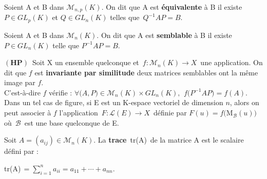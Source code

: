 \vspace{1.3cm}

Soient A et B dans \(\mathcal{M}_{n,p}(K)\). On dit que A est \textbf{équivalente} à B \ssi il existe \(P\in GL_p(K)\) et \(Q\in GL_n(K)\) telles que \(\,Q^{-1}AP=B\).

\vspace{1cm}

Soient A et B dans \(\mathcal{M}_n(K)\). On dit que A est \textbf{semblable} à B \ssi il existe \(P\in GL_n(K)\) telle que \(P^{-1}AP=B.\)

\vspace{1.3cm}

\(\left(\mathbf{HP}\right)\,\) Soit X un ensemble quelconque et \(\,f:\mathcal{M}_n(K)\to X\,\) une application. On dit que $f$ est \textbf{invariante par similitude} \ssi deux matrices semblables ont la même image par $f$.\vspace{0.1cm}\\ 
C'est-à-dire \ssi $f$ vérifie : \(\forall\bigl(A,P\bigr)\in\mathcal{M}_n(K)\times GL_n(K),\ \, f\bigl(P^{-1}AP\bigr)=f(A).\)\vspace{0.1cm}\\
Dans un tel cas de figure, si E est un K-espace vectoriel de dimension $n$, alors on peut associer à $f$ l'application \(\,F:\mathscr{L}(E)\to X\,\) définie par \(F(u)=f\bigl(\text{M}_\mathcal{B}(u)\bigr)\) où \(\,\mathcal{B}\,\) est une base quelconque de E.

\vspace{1.5cm}

Soit \(A=(a_{ij})\in\mathcal{M}_n(K)\). La \textbf{trace}\, tr(A)\, de la matrice A est le scalaire défini par :

\hspace{5cm}tr(A)\(\displaystyle\,=\sum_{i=1}^{n}a_{ii}=a_{11}+\cdots+a_{nn}.\)

\vspace{1cm}

